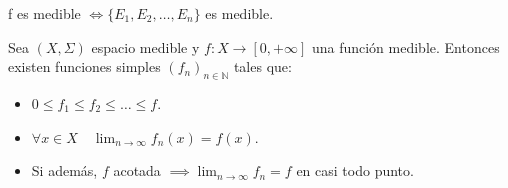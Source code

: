 \begin{observación}
f es medible $\iff \{E_1, E_2, \dots, E_n\}$ es medible.
\end{observación}
\begin{teorema}
    Sea $(X, \Sigma)$ espacio medible y $f: X \to [0, +\infty]$ una función medible. Entonces existen funciones simples $(f_n)_{n \in \mathbb{N}}$ tales que:
    \begin{itemize}
        \item $0 \leq f_1 \leq f_2 \leq \dots \leq f$.
        \item $\forall x \in X \quad \lim_{n \to \infty}f_n(x) = f(x)$.
        \item Si además, $f$ acotada $\implies \lim_{n \to \infty}f_n = f$ en casi todo
              punto.
    \end{itemize}
\end{teorema}
